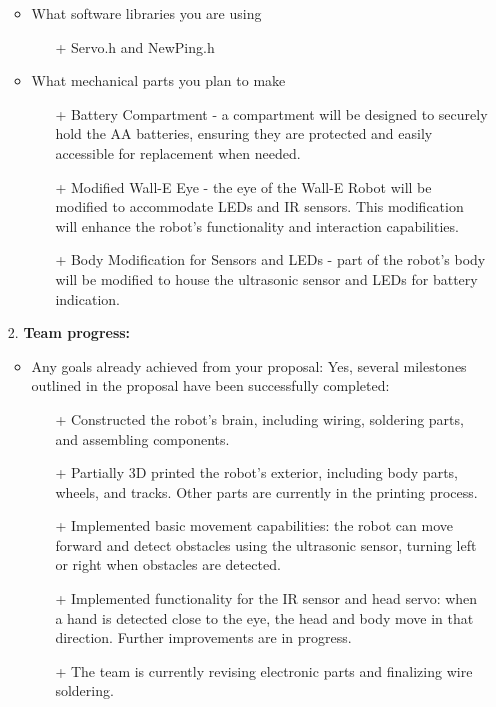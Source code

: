 \documentclass[12pt]{article}
\begin{document}
\begin{itemize}
\begin{itemize}
\begin{figure}[H]
            \label{fig:enter-label}
        \end{figure}
        \item What software libraries you are using
        \begin{itemize}
            \item[+] Servo.h and NewPing.h
        \end{itemize}
        \item What mechanical parts you plan to make
        \begin{itemize}
            \item[+] Battery Compartment - a compartment will be designed to securely hold the AA batteries, ensuring they are protected and easily accessible for replacement when needed.
            \item[+] Modified Wall-E Eye - the eye of the Wall-E Robot will be modified to accommodate LEDs and IR sensors. This modification will enhance the robot's functionality and interaction capabilities.
            \item[+] Body Modification for Sensors and LEDs -  part of the robot's body will be modified to house the ultrasonic sensor and LEDs for battery indication. 
        \end{itemize}
    \end{itemize}
    \item[2.] \textbf{Team progress:}
    \begin{itemize}
        \item Any goals already achieved from your proposal: Yes, several milestones outlined in the proposal have been successfully completed:
        \begin{itemize}
            \item[+] Constructed the robot's brain, including wiring, soldering parts, and assembling components.
            \item[+] Partially 3D printed the robot's exterior, including body parts, wheels, and tracks. Other parts are currently in the printing process.
            \item[+] Implemented basic movement capabilities: the robot can move forward and detect obstacles using the ultrasonic sensor, turning left or right when obstacles are detected.
            \item[+] Implemented functionality for the IR sensor and head servo: when a hand is detected close to the eye, the head and body move in that direction. Further improvements are in progress.
            \item[+] The team is currently revising electronic parts and finalizing wire soldering.

\end{itemize}
\end{itemize}
\end{itemize}
\end{document}
